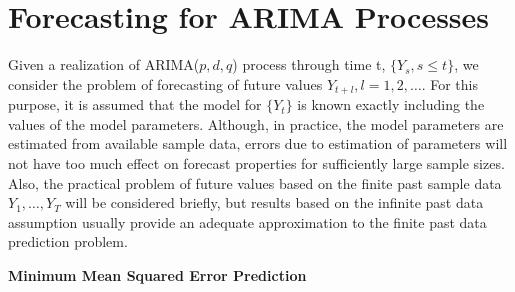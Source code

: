 \section{Forecasting for ARIMA Processes} \label{in:forecast1}

Given a realization of ARIMA($p,d,q$) process through time t, $\{ Y_s, s \leq t \}$, we consider the problem of forecasting of future values $Y_{t+l}, l = 1,2, \ldots$. For this purpose, it is assumed that the model for $\{ Y_t \}$ is known exactly including the values of the model parameters. Although, in practice, the model parameters are estimated from available sample data, errors due to estimation of parameters will not have too much effect on forecast properties for sufficiently large sample sizes. Also, the practical problem of future values based on the finite past sample data $Y_1, \ldots, Y_T$ will be considered briefly, but results based on the infinite past data assumption usually provide an adequate approximation to the finite past data prediction problem. \twomedskip


\noindent \textbf{Minimum Mean Squared Error Prediction} \twomedskip


